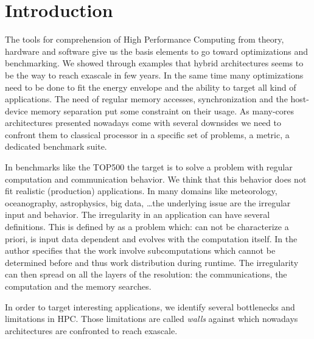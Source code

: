 
\chapter*{Introduction}

The tools for comprehension of High Performance Computing from theory, hardware and software give us the basis elements to go toward optimizations and benchmarking. 
We showed through examples that hybrid architectures seems to be the way to reach exascale in few years.
In the same time many optimizations need to be done to fit the energy envelope and the ability to target all kind of applications. 
The need of regular memory accesses, synchronization and the host-device memory separation put some constraint on their usage.
As many-cores architectures presented nowadays come with several downsides we need to confront them to classical processor in a specific set of problems, a metric, a dedicated benchmark suite. 


In benchmarks like the TOP500 the target is to solve a problem with regular computation and communication behavior. 
We think that this behavior does not fit realistic (production) applications.
In many domains like meteorology, oceanography, astrophysics, big data, \dots the underlying issue are the irregular input and behavior.
The irregularity in an application can have several definitions. 
This is defined by \cite{javairregular} as a problem which: can not be characterize a priori, is input data dependent and evolves with the computation itself. 
In \cite{suss2006implementing} the author specifies that the work involve subcomputations which cannot be determined before and thus work distribution during runtime.
The irregularity can then spread on all the layers of the resolution:
the communications, the computation and the memory searches. 

In order to target interesting applications, we identify several bottlenecks and limitations in HPC. 
Those limitations are called \textit{walls} against which nowadays architectures are confronted to reach exascale. 

